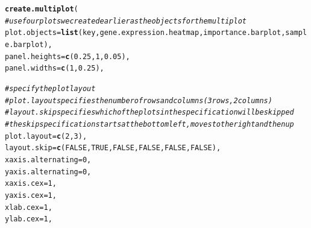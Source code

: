 \documentclass[letterpaper]{report}\usepackage[]{graphicx}\usepackage[]{color}
\makeatletter
\newcommand{\hlnum}[1]{\textcolor[rgb]{0.686,0.059,0.569}{#1}}%
\newcommand{\hlcom}[1]{\textcolor[rgb]{0.678,0.584,0.686}{\textit{#1}}}%
\newcommand{\hlstd}[1]{\textcolor[rgb]{0.345,0.345,0.345}{#1}}%
\newcommand{\hlkwc}[1]{\textcolor[rgb]{0.333,0.667,0.333}{#1}}%
\newcommand{\hlkwd}[1]{\textcolor[rgb]{0.737,0.353,0.396}{\textbf{#1}}}%
\newenvironment{kframe}{%
 \def\at@end@of@kframe{}%
 \ifinner\ifhmode%
  \def\at@end@of@kframe{\end{minipage}}%
  \begin{minipage}{\columnwidth}%
 \fi\fi%
 \def\FrameCommand##1{\hskip\@totalleftmargin \hskip-\fboxsep
 \colorbox{shadecolor}{##1}\hskip-\fboxsep
     \hskip-\linewidth \hskip-\@totalleftmargin \hskip\columnwidth}%
 \MakeFramed {\advance\hsize-\width
   \@totalleftmargin\z@ \linewidth\hsize
   \@setminipage}}%
 {\par\unskip\endMakeFramed%
 \at@end@of@kframe}
\newenvironment{knitrout}{}{} %
\makeatother
\begin{document}
\begin{knitrout}
\color{fgcolor}\begin{kframe}
\begin{alltt}
\hlkwd{create.multiplot}\hlstd{(}
    \hlcom{# use four plots we created earlier as the objects for the multiplot}
    \hlkwc{plot.objects} \hlstd{=} \hlkwd{list}\hlstd{(key, gene.expression.heatmap, importance.barplot, sample.barplot),}
    \hlkwc{panel.heights} \hlstd{=} \hlkwd{c}\hlstd{(}\hlnum{0.25}\hlstd{,} \hlnum{1}\hlstd{,} \hlnum{0.05}\hlstd{),}
    \hlkwc{panel.widths} \hlstd{=} \hlkwd{c}\hlstd{(}\hlnum{1}\hlstd{,} \hlnum{0.25}\hlstd{),}

    \hlcom{# specify the plot layout }
    \hlcom{# plot.layout specifies the number of rows and columns (3 rows, 2 columns)}
    \hlcom{# layout.skip specifies which of the plots in the specification will be skipped}
    \hlcom{# the skip specification starts at the bottom left, moves to the right and then up}
    \hlkwc{plot.layout} \hlstd{=} \hlkwd{c}\hlstd{(}\hlnum{2}\hlstd{,} \hlnum{3}\hlstd{),}
    \hlkwc{layout.skip} \hlstd{=} \hlkwd{c}\hlstd{(}\hlnum{FALSE}\hlstd{,} \hlnum{TRUE}\hlstd{,} \hlnum{FALSE}\hlstd{,} \hlnum{FALSE}\hlstd{,} \hlnum{FALSE}\hlstd{,} \hlnum{FALSE}\hlstd{),}
    \hlkwc{xaxis.alternating} \hlstd{=} \hlnum{0}\hlstd{,}
    \hlkwc{yaxis.alternating} \hlstd{=} \hlnum{0}\hlstd{,}
    \hlkwc{xaxis.cex} \hlstd{=} \hlnum{1}\hlstd{,}
    \hlkwc{yaxis.cex} \hlstd{=} \hlnum{1}\hlstd{,}
    \hlkwc{xlab.cex} \hlstd{=} \hlnum{1}\hlstd{,}
    \hlkwc{ylab.cex} \hlstd{=} \hlnum{1}\hlstd{,}


\end{alltt}
\end{kframe}
\end{knitrout}
\end{document}
